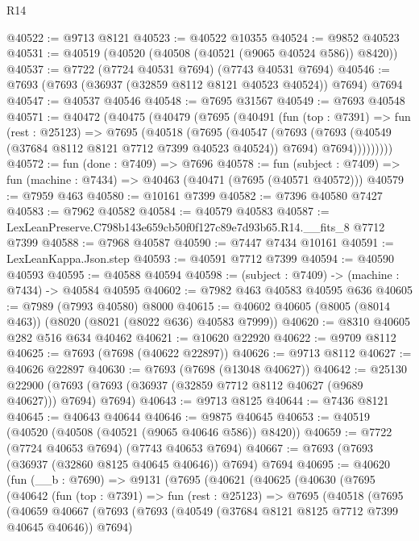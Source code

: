 \begin{lexlean}{R14}
\begin{coremodule}
@40522 := @9713 @8121
@40523 := @40522 @10355
@40524 := @9852 @40523
@40531 := @40519 (@40520 (@40508 (@40521 (@9065 @40524 @586)) @8420))
@40537 := @7722 (@7724 @40531 @7694) (@7743 @40531 @7694)
@40546 := @7693 (@7693 (@36937 (@32859 @8112 @8121 @40523 @40524)) @7694) @7694
@40547 := @40537 @40546
@40548 := @7695 @31567
@40549 := @7693 @40548
@40571 := @40472
    (@40475
      (@40479
        (@7695
          (@40491
            (fun (top : @7391) =>
            fun (rest : @25123) =>
            @7695
              (@40518
                (@7695
                  (@40547
                    (@7693
                      (@7693 (@40549 (@37684 @8112 @8121 @7712 @7399 @40523 @40524)) @7694)
                      @7694)))))))))
@40572 := fun (done : @7409) => @7696
@40578 := fun (subject : @7409) => fun (machine : @7434) => @40463 (@40471 (@7695 (@40571 @40572)))
@40579 := @7959 @463
@40580 := @10161 @7399
@40582 := @7396 @40580 @7427
@40583 := @7962 @40582
@40584 := @40579 @40583
@40587 := LexLeanPreserve.C798b143e659cb50f0f127c89e7d93b65.R14.__fits_8 @7712 @7399
@40588 := @7968 @40587
@40590 := @7447 @7434 @10161
@40591 := LexLeanKappa.Json.step
@40593 := @40591 @7712 @7399
@40594 := @40590 @40593
@40595 := @40588 @40594
@40598 := (subject : @7409) -> (machine : @7434) -> @40584 @40595
@40602 := @7982 @463 @40583 @40595 @636
@40605 := @7989 (@7993 @40580) @8000
@40615 := @40602 @40605 (@8005 (@8014 @463)) (@8020 (@8021 (@8022 @636) @40583 @7999))
@40620 := @8310 @40605 @282 @516 @634 @40462
@40621 := @10620 @22920
@40622 := @9709 @8112
@40625 := @7693 (@7698 (@40622 @22897))
@40626 := @9713 @8112
@40627 := @40626 @22897
@40630 := @7693 (@7698 (@13048 @40627))
@40642 := @25130
    @22900
    (@7693 (@7693 (@36937 (@32859 @7712 @8112 @40627 (@9689 @40627))) @7694) @7694)
@40643 := @9713 @8125
@40644 := @7436 @8121
@40645 := @40643 @40644
@40646 := @9875 @40645
@40653 := @40519 (@40520 (@40508 (@40521 (@9065 @40646 @586)) @8420))
@40659 := @7722 (@7724 @40653 @7694) (@7743 @40653 @7694)
@40667 := @7693 (@7693 (@36937 (@32860 @8125 @40645 @40646)) @7694) @7694
@40695 := @40620
    (fun (__b : @7690) =>
    @9131
      (@7695
        (@40621
          (@40625
            (@40630
              (@7695
                (@40642
                  (fun (top : @7391) =>
                  fun (rest : @25123) =>
                  @7695
                    (@40518
                      (@7695
                        (@40659
                          @40667
                          (@7693
                            (@7693 (@40549 (@37684 @8121 @8125 @7712 @7399 @40645 @40646)) @7694)

\end{coremodule}
\end{lexlean}
